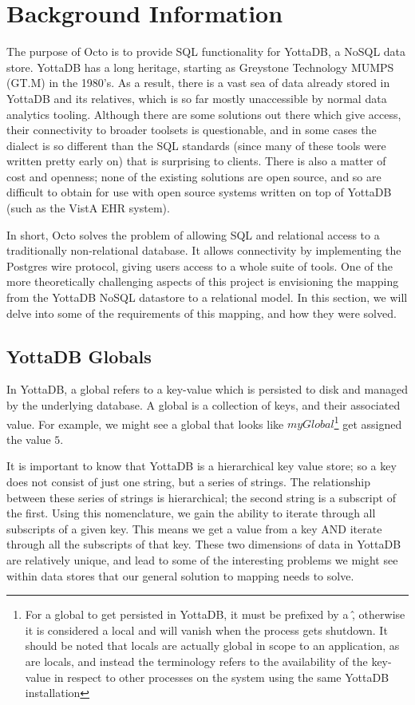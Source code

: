 \documentclass[]{article}
\begin{document}
\section{Background Information}

The purpose of Octo is to provide SQL functionality for YottaDB, a NoSQL data store.
YottaDB has a long heritage, starting as Greystone Technology MUMPS (GT.M) in the 1980's.
As a result, there is a vast sea of data already stored in YottaDB and its relatives, which is so far mostly unaccessible by normal data analytics tooling.
Although there are some solutions out there which give access, their connectivity to broader toolsets is questionable, and in some cases the dialect is so different than the SQL standards (since many of these tools were written pretty early on) that is surprising to clients.
There is also a matter of cost and openness; none of the existing solutions are open source, and so are difficult to obtain for use with open source systems written on top of YottaDB (such as the VistA EHR system).

In short, Octo solves the problem of allowing SQL and relational access to a traditionally non-relational database.
It allows connectivity by implementing the Postgres wire protocol, giving users access to a whole suite of tools.
One of the more theoretically challenging aspects of this project is envisioning the mapping from the YottaDB NoSQL datastore to a relational model.
In this section, we will delve into some of the requirements of this mapping, and how they were solved.

\subsection{YottaDB Globals}

In YottaDB, a global refers to a key-value which is persisted to disk and managed by the underlying database.
A global is a collection of keys, and their associated value.
For example, we might see a global that looks like $myGlobal$\footnote{For a global to get persisted in YottaDB, it must be prefixed by a \^, otherwise it is considered a local and will vanish when the process gets shutdown. It should be noted that locals are actually global in scope to an application, as are locals, and instead the terminology refers to the availability of the key-value in respect to other processes on the system using the same YottaDB installation} get assigned the value $5$.

It is important to know that YottaDB is a hierarchical key value store; so a key does not consist of just one string, but a series of strings.
The relationship between these series of strings is hierarchical; the second string is a subscript of the first.
Using this nomenclature, we gain the ability to iterate through all subscripts of a given key.
This means we get a value from a key AND iterate through all the subscripts of that key.
These two dimensions of data in YottaDB are relatively unique, and lead to some of the interesting problems we might see within data stores that our general solution to mapping needs to solve.
\end{document}
